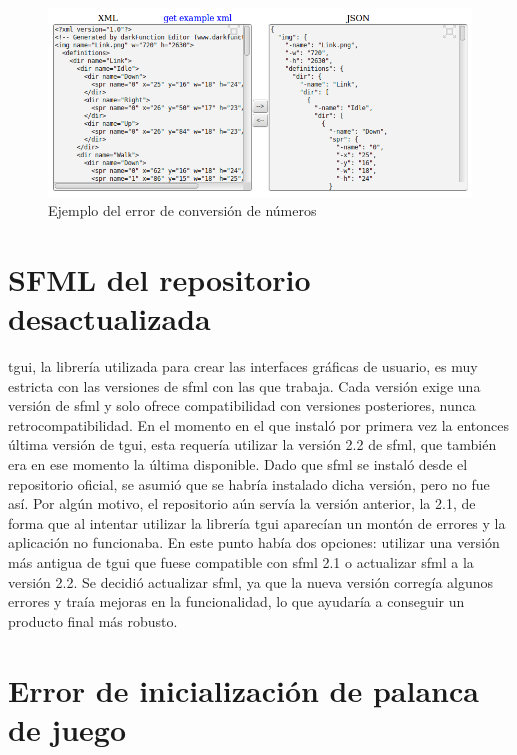 	\begin{figure}[!htp]
		 \centering
		 \includegraphics[scale=.5]{fig/conversionNums}
		 \caption{Ejemplo del error de conversión de números}
		 \label{fig:conversionNums}
	\end{figure}

\section{SFML del repositorio desactualizada}

	\acrshort{tgui}, la librería utilizada para crear las interfaces gráficas de usuario, es muy estricta con las versiones de \acrshort{sfml} con las que trabaja. Cada versión exige una versión de \acrshort{sfml} y solo ofrece compatibilidad con versiones posteriores, nunca retrocompatibilidad. En el momento en el que instaló por primera vez la entonces última versión de \acrshort{tgui}, esta requería utilizar la versión 2.2 de \acrshort{sfml}, que también era en ese momento la última disponible. Dado que \acrshort{sfml} se instaló desde el repositorio oficial, se asumió que se habría instalado dicha versión, pero no fue así. Por algún motivo, el repositorio aún servía la versión anterior, la 2.1, de forma que al intentar utilizar la librería \acrshort{tgui} aparecían un montón de errores y la aplicación no funcionaba. En este punto había dos opciones: utilizar una versión más antigua de \acrshort{tgui} que fuese compatible con \acrshort{sfml} 2.1 o actualizar \acrshort{sfml} a la versión 2.2. Se decidió actualizar \acrshort{sfml}, ya que la nueva versión corregía algunos errores y traía mejoras en la funcionalidad, lo que ayudaría a conseguir un producto final más robusto.

\section{Error de inicialización de palanca de juego}

